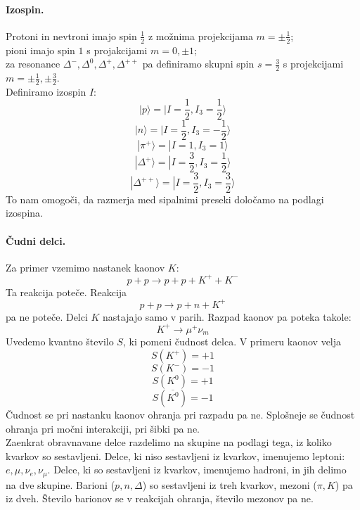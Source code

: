 \documentclass[a4paper]{article}
\begin{document}
\paragraph{Izospin.} Protoni in nevtroni imajo spin \(\displaystyle{\frac{1}{2}}\) z možnima projekcijama \(\displaystyle{m = \pm \frac{1}{2}}\); \\[2mm] pioni imajo spin \(1\) s projakcijami
\(m = 0, \pm 1\); \\[2mm] za resonance \(\Delta^-, \Delta^0, \Delta^+, \Delta^{++}\) pa definiramo skupni spin \(s = \frac{3}{2}\) s projekcijami \(m = \displaystyle{\pm \frac{1}{2}, \pm \frac{3}{2}}\). \\[2mm]
Definiramo izospin \(I\):
\[|p\rangle = |I = \frac{1}{2}, I_3 = \frac{1}{2}\rangle\]
\[|n\rangle = |I = \frac{1}{2}, I_3 = -\frac{1}{2}\rangle\]
\[|\pi^+\rangle = |I = 1, I_3 = 1\rangle\]
\[|\Delta^+\rangle = |I = \frac{3}{2}, I_3 = \frac{1}{2}\rangle\]
\[|\Delta^{++}\rangle = |I = \frac{3}{2}, I_3 = \frac{3}{2}\rangle\]
To nam omogoči, da razmerja med sipalnimi preseki določamo na podlagi izospina.
\paragraph{Čudni delci.} Za primer vzemimo nastanek kaonov \(K\):
\[p + p \to p + p + K^+ + K^-\]
Ta reakcija poteče. Reakcija
\[p + p \to p + n + K^+\]
pa ne poteče. Delci \(K\) nastajajo samo v parih. Razpad kaonov pa poteka takole:
\[K^+ \to \mu^+\nu_m\]
Uvedemo kvantno število \(S\), ki pomeni čudnost delca. V primeru kaonov velja
\[S(K^+) = +1\]
\[S(K^-) = -1\]
\[S(K^0) = +1\]
\[S(\overline{K^0}) = -1\]
Čudnost se pri nastanku kaonov ohranja pri razpadu pa ne. Splošneje se čudnost ohranja pri močni interakciji, pri šibki pa ne. \\[3mm]
Zaenkrat obravnavane delce razdelimo na skupine na podlagi tega, iz koliko kvarkov so sestavljeni. Delce, ki niso sestavljeni iz kvarkov, imenujemo leptoni:
\(e, \mu, \nu_e, \nu_\mu\). Delce, ki so sestavljeni iz kvarkov, imenujemo hadroni, in jih delimo na dve skupine. Barioni (\(p, n, \Delta\)) so sestavljeni
iz treh kvarkov, mezoni (\(\pi, K\)) pa iz dveh. Število barionov se v reakcijah ohranja, število mezonov pa ne.
\newpage
\end{document}
